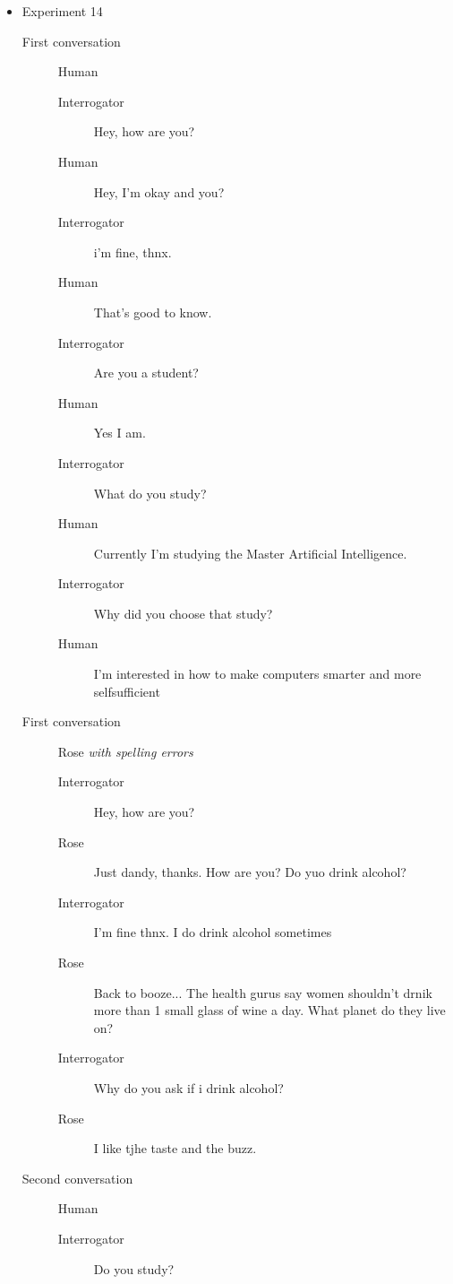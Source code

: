 \begin{itemize}
   \item Experiment 14
      \begin{description}
         \item [First conversation] Human
            \begin{description}
               \item [Interrogator] Hey, how are you?
               \item [Human] Hey, I'm okay and you?
               \item [Interrogator] i'm fine, thnx.
               \item [Human] That's good to know.
               \item [Interrogator] Are you a student?
               \item [Human] Yes I am.
               \item [Interrogator] What do you study?
               \item [Human] Currently I'm studying the Master Artificial Intelligence.
               \item [Interrogator] Why did you choose that study?
               \item [Human] I'm interested in how to make computers smarter and more selfsufficient
            \end{description}
         \item [First conversation] Rose \textit{with spelling errors}
            \begin{description}
               \item [Interrogator] Hey, how are you?
               \item [Rose] Just dandy, thanks. How are you? Do yuo drink alcohol?
               \item [Interrogator] I'm fine thnx. I do drink alcohol sometimes
               \item [Rose] Back to booze... The health gurus say women shouldn't drnik more than 1 small glass of wine a day. What planet do they live on?
               \item [Interrogator] Why do you ask if i drink alcohol?
               \item [Rose] I like tjhe taste and the buzz.
            \end{description}
         \item [Second conversation] Human
            \begin{description}
               \item [Interrogator] Do you study?

\end{description}
\end{description}
\end{itemize}
